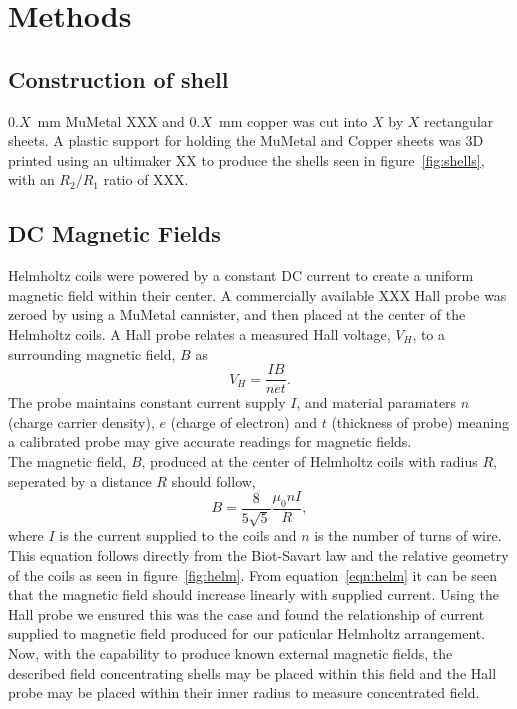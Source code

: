 \documentclass[11pt]{iopart}
\begin{document}

\section{Methods}
\subsection{Construction of shell}
$0.X$~mm MuMetal XXX and $0.X$~mm copper was cut into $X$ by $X$ rectangular sheets. 
A plastic support for holding the MuMetal and Copper sheets was 3D printed using an ultimaker XX to produce the shells seen in figure~\ref{fig:shells}, with an $R_2/R_1$ ratio of XXX.\\

\subsection{DC Magnetic Fields}
Helmholtz coils were powered by a constant DC current to create a
uniform magnetic field within their center. A commercially available
XXX Hall probe was zeroed by using a MuMetal cannister, and then
placed at the center of the Helmholtz coils.  A Hall probe relates a
measured Hall voltage, $V_H$, to a surrounding magnetic field, $B$
\cite{XXX} as
\begin{equation}
  V_H = \frac{IB}{net}.
\end{equation}
The probe maintains constant current supply $I$, and material
paramaters $n$ (charge carrier density), $e$ (charge of electron) and
$t$ (thickness of probe) meaning a calibrated probe may give accurate
readings for magnetic fields.\\
The magnetic field, $B$, produced at the center of Helmholtz coils
with radius $R$, seperated by a distance $R$ should follow,
\begin{equation}
  B = \frac{8}{5\sqrt{5}}\frac{\mu_0 nI}{R},
  \label{eqn:helm}
\end{equation}
where $I$ is the current supplied to the coils and $n$ is the number of
turns of wire. This equation follows directly from the Biot-Savart law
\cite{XXX} and the relative geometry of the coils as seen in
figure~\ref{fig:helm}. From equation~\ref{eqn:helm} it can be seen that
the magnetic field should increase linearly with supplied
current. Using the Hall probe we ensured this was the case and found
the relationship of current supplied to magnetic field produced for
our paticular Helmholtz arrangement.\\ Now, with the capability to
produce known external magnetic fields, the described field
concentrating shells may be placed within this field and the Hall
probe may be placed within their inner radius to measure concentrated
field.
\end{document}
